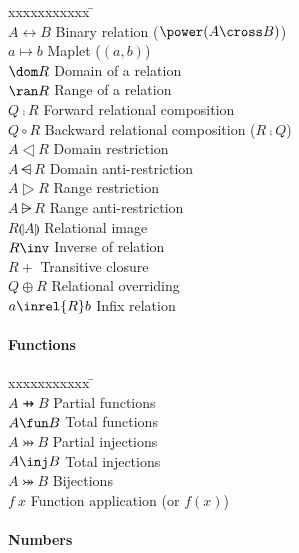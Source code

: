 \begin{tabbing}
xxxxxxxxxxx \= \kill \\ 
$A \rel B$ \> Binary relation ($\power (A \cross B)$) \\
$a \mapsto b$ \> Maplet ($(a,b)$) \\
$\dom R$ \> Domain of a relation \\
$\ran R$ \> Range of a relation \\
$Q \comp R$ \> Forward relational composition \\
$Q \circ R$ \> Backward relational composition ($R \comp Q$) \\
$A \dres R$ \> Domain restriction \\
$A \ndres R$ \> Domain anti-restriction \\
$A \rres R$ \> Range restriction \\
$A \nrres R$ \> Range anti-restriction \\
$R \limg A \rimg$ \> Relational image \\
$R \inv$ \> Inverse of relation \\
$R \plus$ \> Transitive closure \\
$Q \oplus R$ \> Relational overriding \\
$a \inrel{R} b$ \> Infix relation \\
\end{tabbing}

\paragraph{Functions}

\begin{tabbing}
xxxxxxxxxxx \= \kill \\ 
$A \pfun B$ \> Partial functions \\
$A \fun B$ \> Total functions \\
$A \pinj B$ \> Partial injections \\
$A \inj B$ \> Total injections \\
$A \bij B$ \> Bijections \\
$f~x$ \> Function application (or $f(x)$) \\
\end{tabbing}

\paragraph{Numbers}

